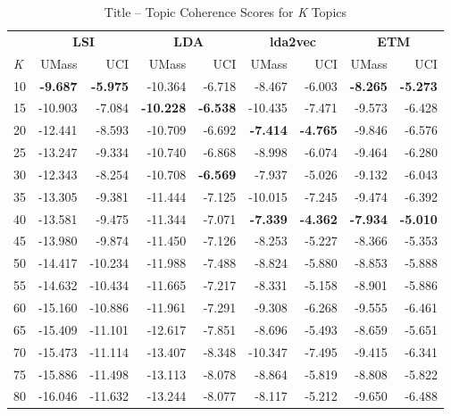 \documentclass[letterpaper,12pt]{article}
\begin{document}
\begin{table}
	\caption{\label{tab:combo_title_tc} Title -- Topic Coherence Scores for \emph{K} Topics}
	\begin{center}
		\begin{tabular}{|l|rr|rr|rr|rr|}
			\hline
			{} & \multicolumn{2}{c|}{\textbf{LSI}} & \multicolumn{2}{c|}{\textbf{LDA}} & \multicolumn{2}{c|}{\textbf{lda2vec}} & \multicolumn{2}{c|}{\textbf{ETM}} \\
			\emph{K} &   UMass &     UCI &   UMass &    UCI &   UMass &    UCI &  UMass &    UCI \\
			\hline
			10  &  \textbf{-9.687} &  \textbf{-5.975} & -10.364 & -6.718 &  -8.467 & -6.003 & \textbf{-8.265} & \textbf{-5.273} \\
			15  & -10.903 &  -7.084 & \textbf{-10.228} & \textbf{-6.538} & -10.435 & -7.471 & -9.573 & -6.428 \\
			20  & -12.441 &  -8.593 & -10.709 & -6.692 & \textbf{-7.414} & \textbf{-4.765} & -9.846 & -6.576 \\
			25  & -13.247 &  -9.334 & -10.740 & -6.868 &  -8.998 & -6.074 & -9.464 & -6.280 \\
			30  & -12.343 &  -8.254 & -10.708 & \textbf{-6.569} &  -7.937 & -5.026 & -9.132 & -6.043 \\
			35  & -13.305 &  -9.381 & -11.444 & -7.125 & -10.015 & -7.245 & -9.474 & -6.392 \\
			40  & -13.581 &  -9.475 & -11.344 & -7.071 &  \textbf{-7.339} & \textbf{-4.362} & \textbf{-7.934} & \textbf{-5.010} \\
			45  & -13.980 &  -9.874 & -11.450 & -7.126 &  -8.253 & -5.227 & -8.366 & -5.353 \\
			50  & -14.417 & -10.234 & -11.988 & -7.488 &  -8.824 & -5.880 & -8.853 & -5.888 \\
			55  & -14.632 & -10.434 & -11.665 & -7.217 &  -8.331 & -5.158 & -8.901 & -5.886 \\
			60  & -15.160 & -10.886 & -11.961 & -7.291 &  -9.308 & -6.268 & -9.555 & -6.461 \\
			65  & -15.409 & -11.101 & -12.617 & -7.851 &  -8.696 & -5.493 & -8.659 & -5.651 \\
			70  & -15.473 & -11.114 & -13.407 & -8.348 & -10.347 & -7.495 & -9.415 & -6.341 \\
			75  & -15.886 & -11.498 & -13.113 & -8.078 &  -8.864 & -5.819 & -8.808 & -5.822 \\
			80  & -16.046 & -11.632 & -13.244 & -8.077 &  -8.117 & -5.212 & -9.650 & -6.488 \\

\end{tabular}
\end{center}
\end{table}
\end{document}
